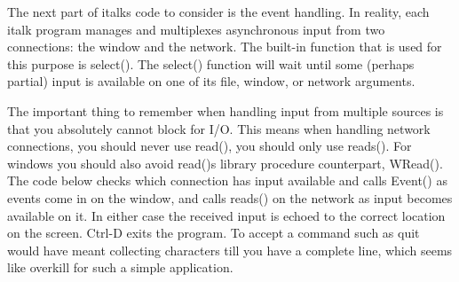 The next part of \textsf{italk}{\textquotesingle}s code to consider is
the event handling. In reality, each \textsf{italk} program manages and
multiplexes asynchronous input from two connections: the window and the
network. The built-in function that is used for this purpose is
\textsf{select()}. The \textsf{select()} function will wait until some
(perhaps partial) input is available on one of its file, window, or
network arguments.

The important thing to remember when handling input from multiple
sources is that you absolutely cannot block for I/O. This means when
handling network connections, you should never use \textsf{read()}, you
should only use \textsf{reads()}. For windows you should also avoid
\textsf{read()}{\textquotesingle}s library procedure counterpart,
\textsf{WRead()}. The code below checks which connection has input
available and calls \textsf{Event()} as events come in on the window,
and calls \textsf{reads()} on the network as input becomes available on
it. In either case the received input is echoed to the correct location
on the screen. Ctrl-D exits the program. To accept a command such as
{\textquotedbl}quit{\textquotedbl} would have meant collecting
characters till you have a complete line, which seems like overkill for
such a simple application.


